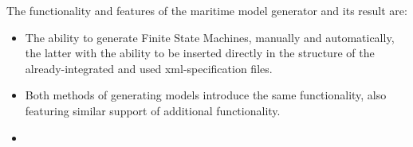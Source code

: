 The functionality and features of the maritime model generator and its result are:
\begin{itemize}
  \item The ability to generate Finite State Machines, manually and automatically, the latter with the ability to be inserted directly in the structure of the already-integrated and used xml-specification files.
  \item Both methods of generating models introduce the same functionality, also featuring similar support of additional functionality.
  \item \TODO{ }
\end{itemize}


